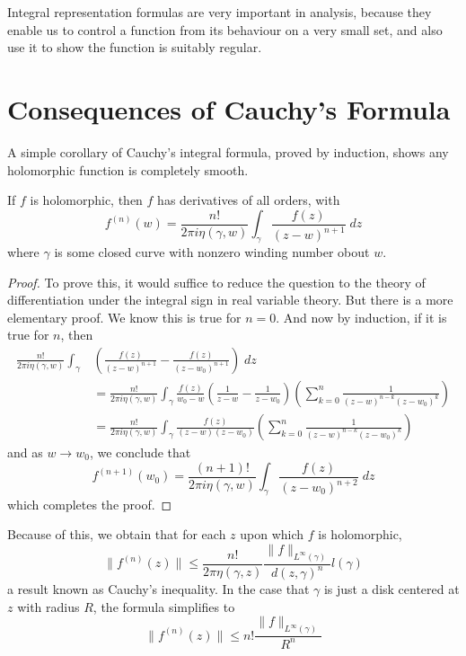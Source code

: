 \begin{remark}
Integral representation formulas are very important in analysis, because they enable us to control a function from its behaviour on a very small set, and also use it to show the function is suitably regular.
\end{remark}

\section{Consequences of Cauchy's Formula}

A simple corollary of Cauchy's integral formula, proved by induction, shows any holomorphic function is completely smooth.

\begin{theorem}
    If $f$ is holomorphic, then $f$ has derivatives of all orders, with
    \[ f^{(n)}(w) = \frac{n!}{2 \pi i \eta(\gamma,w)} \int_\gamma \frac{f(z)}{(z - w)^{n+1}}\; dz \]
    where $\gamma$ is some closed curve with nonzero winding number obout $w$.
\end{theorem}
\begin{proof}
    To prove this, it would suffice to reduce the question to the theory of differentiation under the integral sign in real variable theory. But there is a more elementary proof. We know this is true for $n = 0$. And now by induction, if it is true for $n$, then
    \begin{align*}
        \frac{n!}{2 \pi i \eta(\gamma,w)} \int_\gamma & \left( \frac{f(z)}{(z - w)^{n+1}} - \frac{f(z)}{(z - w_0)^{n+1}} \right)\; dz\\
        &= \frac{n!}{2 \pi i \eta(\gamma,w)} \int_\gamma \frac{f(z)}{w_0 - w} \left( \frac{1}{z - w} - \frac{1}{z - w_0} \right) \left( \sum_{k = 0}^n \frac{1}{(z - w)^{n-k}(z - w_0)^k} \right)\\
        &= \frac{n!}{2 \pi i \eta(\gamma,w)} \int_\gamma \frac{f(z)}{(z - w)(z - w_0)} \left( \sum_{k = 0}^n \frac{1}{(z - w)^{n-k}(z - w_0)^k} \right)
    \end{align*}
    and as $w \to w_0$, we conclude that
    \[ f^{(n+1)}(w_0) = \frac{(n+1)!}{2 \pi i \eta(\gamma,w)} \int_\gamma \frac{f(z)}{(z - w_0)^{n+2}}\; dz \]
    which completes the proof.
\end{proof}

\begin{remark}
    Because of this, we obtain that for each $z$ upon which $f$ is holomorphic,
    \[ \| f^{(n)}(z) \| \leq \frac{n!}{2\pi \eta(\gamma,z)} \frac{\| f \|_{L^\infty(\gamma)}}{d(z,\gamma)^n} l(\gamma) \]
    a result known as Cauchy's inequality. In the case that $\gamma$ is just a disk centered at $z$ with radius $R$, the formula simplifies to
    \[ \| f^{(n)}(z) \| \leq n! \frac{\| f \|_{L^\infty(\gamma)}}{R^n} \]
\end{remark}

